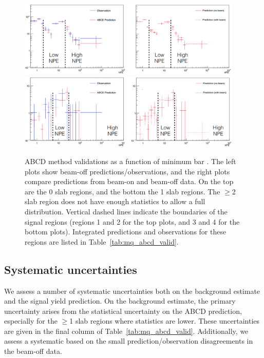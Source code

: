 {\begin{figure}[t]
  \begin{center}
    \includegraphics[width=0.95\textwidth]{figs/milliq/abcd_valid_0slab.png} \vskip2mm
    \includegraphics[width=0.95\textwidth]{figs/milliq/abcd_valid_1slab.png}
    \caption{ABCD method validations as a function of minimum bar \Npe.
      The left plots show beam-off predictions/observations, and the right
      plots compare predictions from beam-on and beam-off data.
      On the top are the 0 slab regions, and the bottom the 1 slab regions.
      The $\geq$2 slab region does not have enough statistics to allow
      a full \Npe distribution. Vertical dashed lines indicate
      the boundaries of the signal regions (regions 1 and 2 for the top plots,
      and 3 and 4 for the bottom plots). Integrated predictions and
      observations for these regions are listed in Table~\ref{tab:mq_abcd_valid}.
            }
    \label{fig:mq_abcd_valid}
  \end{center}
\end{figure}


\subsection{Systematic uncertainties}
\label{sec:mq_systs}

We assess a number of systematic uncertainties both on the background estimate and the
signal yield prediction. On the background estimate, the primary uncertainty arises
from the statistical uncertainty on the ABCD prediction, especially for the $\geq$1
slab regions where statistics are lower. These uncertainties are given
in the final column of Table~\ref{tab:mq_abcd_valid}. Additionally, we assess a systematic
based on the small prediction/observation disagreements in the beam-off data.

}
